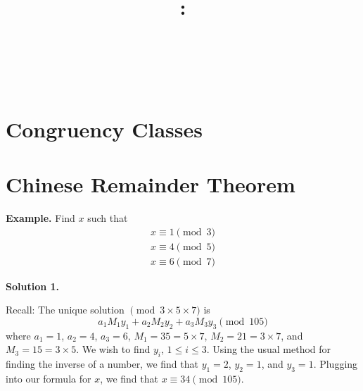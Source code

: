 \documentclass{article}
\title{
    \vspace{2in}
    \textbf{\lectClass:\\ \lectTitle}\\
    \vspace{0.1in}\large{\textit{\lectClassInstructor\ \lectSection}}
    \vspace{3in}
    \author{\textbf{\lectAuthorName}}
    \date{}
}
\begin{document}
\maketitle
\pagebreak

\section*{Congruency Classes}

\section*{Chinese Remainder Theorem}

\textbf{Example. } Find $x$ such that
    \begin{align*}
        x \equiv 1 \pmod{3} \\
        x \equiv 4 \pmod{5} \\
        x \equiv 6 \pmod{7}
    \end{align*}

\textbf{Solution 1. }

Recall: The unique solution $\pmod{3 \times 5 \times 7}$ is $$a_{1}M_{1}y_{1} + a_{2}M_{2}y_{2} + a_{3}M_{3}y_{3} \pmod{105}$$ where $a_{1} = 1$, $a_{2} = 4$, $a_{3} = 6$, $M_{1} = 35 = 5 \times 7$, $M_{2} = 21 = 3 \times 7$, and $M_{3} = 15 = 3 \times 5$. We wish to find $y_{i}$, $1 \le i \le 3$. Using the usual method for finding the inverse of a number, we find that $y_{1} = 2$, $y_{2} = 1$, and $y_{3} = 1$. Plugging into our formula for $x$, we find that $x \equiv 34 \pmod{105}$.
\end{document}
